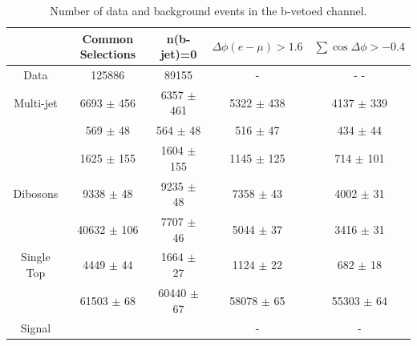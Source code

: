 \begin{table}[tp]
  \centering
   \begin{footnotesize}	
  \begin{tabular}{ccccc}
    \hline\hline
	&	Common Selections			&	n(b-jet)=0			&	$\Delta\phi(e-\mu)>1.6$			&	$\sum\cos\Delta\phi > -0.4$ 		\\	
    \hline
   \hline
Data	&	125886			&	89155			&	-			&	-				-			\\
Multi-jet	&	6693	$\pm$	456	&	6357	$\pm$	461	&	5322	$\pm$	438	&	4137	$\pm$	339	\\
\Zll 	&	569	$\pm$	48	&	564	$\pm$	48	&	516	$\pm$	47	&	434	$\pm$	44		\\
\Wlnu	&	1625	$\pm$	155	&	1604	$\pm$	155	&	1145	$\pm$	125	&	714	$\pm$	101		\\
Dibosons	&	9338	$\pm$	48	&	9235	$\pm$	48	&	7358	$\pm$	43	&	4002	$\pm$	31		\\
\ttbar	&	40632	$\pm$	106	&	7707	$\pm$	46	&	5044	$\pm$	37	&	3416	$\pm$	31		\\
Single Top	&	4449	$\pm$	44	&	1664	$\pm$	27	&	1124	$\pm$	22	&	682	$\pm$	18	\\
\Ztautau	&	61503	$\pm$	68	&	60440	$\pm$	67	&	58078	$\pm$	65	&	55303	$\pm$	64	\\
Signal	&				&				&	-			&	-						\\
    \hline
  \end{tabular}
  \caption{Number of data and background events in the b-vetoed channel.}
  \label{tab:eventsel:bveto}
   \end{footnotesize}	
\end{table}

